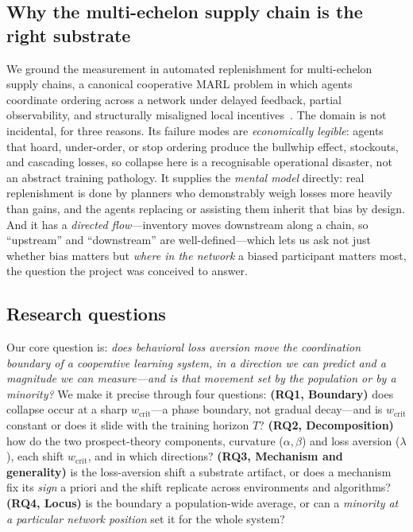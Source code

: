 \documentclass[letterpaper]{article}
\theoremstyle{plain}
\newcommand{\wcrit}{w_{\mathrm{crit}}}
\begin{document}
\subsection{Why the multi-echelon supply chain is the right substrate}
We ground the measurement in automated replenishment for multi-echelon supply
chains, a canonical cooperative MARL problem in which agents coordinate ordering
across a network under delayed feedback, partial observability, and structurally
misaligned local incentives~\citep{oroojlooyjadid2022,gijsbrechts2022,hubbs2020orgym,marlim2023}. The
domain is not incidental, for three reasons. Its failure modes are
\emph{economically legible}: agents that hoard, under-order, or stop ordering
produce the bullwhip effect, stockouts, and cascading losses, so collapse here is
a recognisable operational disaster, not an abstract training pathology. It
supplies the \emph{mental model} directly: real replenishment is done by planners
who demonstrably weigh losses more heavily than gains, and the agents replacing
or assisting them inherit that bias by design. And it has a \emph{directed
flow}---inventory moves downstream along a chain, so ``upstream'' and
``downstream'' are well-defined---which lets us ask not just whether bias matters
but \emph{where in the network} a biased participant matters most, the question
the project was conceived to answer.

\subsection{Research questions}
Our core question is: \emph{does behavioral loss aversion move the coordination
boundary of a cooperative learning system, in a direction we can predict and a
magnitude we can measure---and is that movement set by the population or by a
minority?} We make it precise through four questions:
\textbf{(RQ1, Boundary)} does collapse occur at a sharp $\wcrit$---a phase
boundary, not gradual decay---and is $\wcrit$ constant or does it slide with the
training horizon $T$? \textbf{(RQ2, Decomposition)} how do the two prospect-theory
components, curvature ($\alpha,\beta$) and loss aversion ($\lambda$), each shift
$\wcrit$, and in which directions? \textbf{(RQ3, Mechanism and generality)} is the
loss-aversion shift a substrate artifact, or does a mechanism fix its \emph{sign}
a priori and the shift replicate across environments and algorithms?
\textbf{(RQ4, Locus)} is the boundary a population-wide average, or can a
\emph{minority at a particular network position} set it for the whole system?
\end{document}
